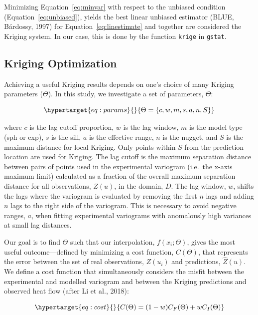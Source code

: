\documentclass[draft,linenumbers]{agujournal2018}
\begin{document}
Minimizing Equation~\ref{eq:minvar} with respect to the unbiased
condition (Equation~\ref{eq:unbiased}), yields the best linear unbiased
estimator (BLUE, Bárdossy, 1997) for Equation~\ref{eq:linestimate} and
together are considered the Kriging system. In our case, this is done by
the function \texttt{krige} in \texttt{gstat}.

\subsection{Kriging Optimization}

Achieving a useful Kriging results depends on one's choice of many
Kriging parameters (\(\Theta\)). In this study, we investigate a set of
parameters, \(\Theta\):

\begin{equation}\protect\hypertarget{eq:params}{}{ \Theta = \{c, w, m, s, a, n, S\} }\label{eq:params}\end{equation}

where \(c\) is the lag cutoff proportion, \(w\) is the lag window, \(m\)
is the model type (sph or exp), \(s\) is the sill, \(a\) is the
effective range, \(n\) is the nugget, and \(S\) is the maximum distance
for local Kriging. Only points within \(S\) from the prediction location
are used for Kriging. The lag cutoff is the maximum separation distance
between pairs of points used in the experimental variogram (i.e.~the
x-axis maximum limit) calculated as a fraction of the overall maximum
separation distance for all observations, \(Z(u)\), in the domain,
\(D\). The lag window, \(w\), shifts the lags where the variogram is
evaluated by removing the first \(n\) lags and adding \(n\) lags to the
right side of the variogram. This is necessary to avoid negative ranges,
\(a\), when fitting experimental variograms with anomalously high
variances at small lag distances.

Our goal is to find \(\Theta\) such that our interpolation,
\(f(x_i; \Theta)\), gives the most useful outcome---defined by
minimizing a cost function, \(C(\Theta)\), that represents the error
between the set of real observations, \(Z(u_i)\) and predictions,
\(\hat{Z}(u)\). We define a cost function that simultaneously considers
the misfit between the experimental and modelled variogram and between
the Kriging predictions and observed heat flow (after Li et al., 2018):

\begin{equation}\protect\hypertarget{eq:cost}{}{ C(\Theta) = (1-w)C_F(\Theta) + wC_I(\Theta) }\label{eq:cost}\end{equation}
\end{document}
